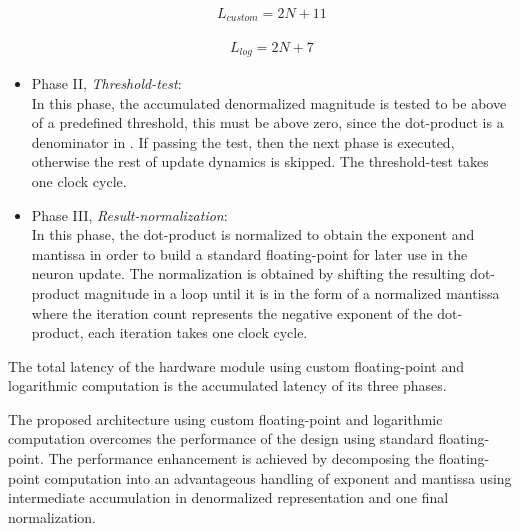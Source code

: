 \begin{itemize}
 	\begin{eqnarray} \label{eq:dot_standard_custom_float_latency}
 	L_{custom}=2N+11
 	\end{eqnarray}
 	
	\begin{eqnarray} \label{eq:dot_log_latency}
 	L_{log}=2N+7
 	\end{eqnarray}
 	
 	\item{Phase II, \emph{Threshold-test}}: \\
	In this phase, the accumulated denormalized magnitude is tested to be above of a predefined threshold, this must be above zero, since the dot-product is a denominator in .
 	If passing the test, then the next phase is executed, otherwise the rest of update dynamics is skipped. The threshold-test takes one clock cycle.
 	\item{Phase III, \emph{Result-normalization}}: \\
 	In this phase, the dot-product is normalized to obtain the exponent and mantissa in order to build a standard floating-point for later use in the neuron update. The normalization is obtained by shifting the resulting dot-product magnitude in a loop until it is in the form of a normalized mantissa where the iteration count represents the negative exponent of the dot-product, each iteration takes one clock cycle.
 	
 \end{itemize}
 
 

The total latency of the hardware module using custom floating-point and logarithmic computation is the accumulated latency of its three phases.

The proposed architecture using custom floating-point and logarithmic computation overcomes the performance of the design using standard floating-point. The performance enhancement is achieved by decomposing the floating-point computation into an advantageous handling of exponent and mantissa using intermediate accumulation in denormalized representation and one final normalization.

